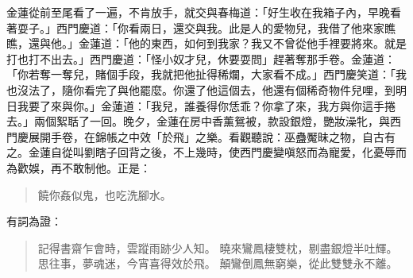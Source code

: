 金蓮從前至尾看了一遍，不肯放手，就交與春梅道：「好生收在我箱子內，早晚看著耍子。」西門慶道：「你看兩日，還交與我。此是人的愛物兒，我借了他來家瞧瞧，還與他。」金蓮道：「他的東西，如何到我家？我又不曾從他手裡要將來。就是打也打不出去。」西門慶道：「怪小奴才兒，休要耍問」趕著奪那手卷。金蓮道：「你若奪一奪兒，賭個手段，我就把他扯得稀爛，大家看不成。」西門慶笑道：「我也沒法了，隨你看完了與他罷麼。你還了他這個去，他還有個稀奇物件兒哩，到明日我要了來與你。」金蓮道：「我兒，誰養得你恁乖？你拿了來，我方與你這手捲去。」兩個絮聒了一回。晚夕，金蓮在房中香薰鴛被，款設銀燈，艷妝澡牝，與西門慶展開手卷，在錦帳之中效「於飛」之樂。看觀聽說：巫蠱魘昧之物，自古有之。金蓮自從叫劉瞎子回背之後，不上幾時，使西門慶變嗔怒而為寵愛，化憂辱而為歡娛，再不敢制他。正是：
\begin{quote}
饒你姦似鬼，也吃洗腳水。
\end{quote}
有詞為證：
\begin{quote}
記得書齋乍會時，雲蹤雨跡少人知。
曉來鸞鳳棲雙枕，剔盡銀燈半吐輝。
思往事，夢魂迷，今宵喜得效於飛。
顛鸞倒鳳無窮樂，從此雙雙永不離。
\end{quote}
